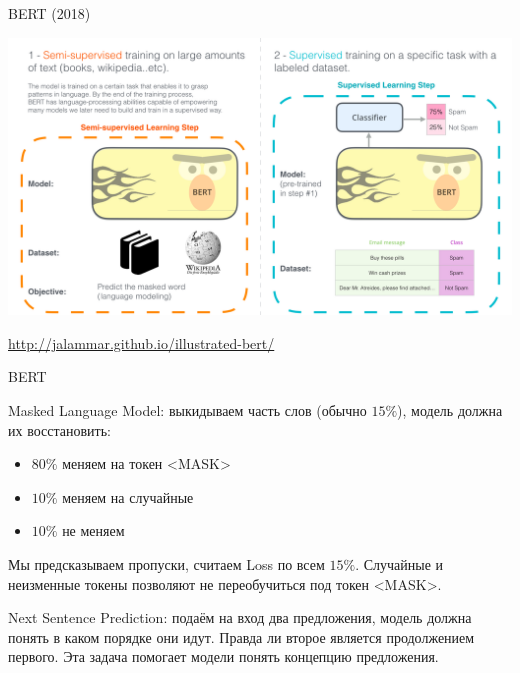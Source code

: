 \documentclass[notes,12pt, aspectratio=169]{beamer}
\newenvironment{wideitemize}{\itemize\addtolength{\itemsep}{10pt}}{\enditemize}
\begin{document}
\begin{frame}{BERT (2018)}
	\begin{center}
		\includegraphics[width=0.8\linewidth]{BERT_stud}
	\end{center}
	\vfill
	\footnotesize
	{\color{blue} \url{http://jalammar.github.io/illustrated-bert/}}
\end{frame}


\begin{frame}{BERT}
	\begin{wideitemize}
		\item  \alert{Masked Language Model: }  выкидываем часть слов (обычно $15\%$), модель должна их восстановить:
				\begin{itemize}
					\item $80\%$ меняем на токен <MASK>
					\item $10\%$ меняем на случайные
					\item $10\%$ не меняем			
				\end{itemize}
		
		Мы предсказываем пропуски, считаем Loss по всем $15\%$. Случайные и неизменные токены позволяют не переобучиться под токен <MASK>.
				
		\item  \alert{Next Sentence Prediction:}  подаём на вход два предложения, модель должна понять в каком порядке они идут. Правда ли второе является продолжением первого. Эта задача помогает модели понять концепцию предложения.
	\end{wideitemize}
\end{frame}
\end{document}
